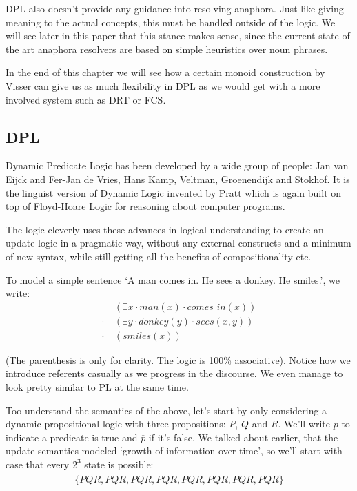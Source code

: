 \documentclass[12pt]{article}
\begin{document}
\begin{itemize}
DPL also doesn't provide any guidance into resolving anaphora. Just like giving meaning to the actual concepts, this must be handled outside of the logic. We will see later in this paper that this stance makes sense, since the current state of the art anaphora resolvers are based on simple heuristics over noun phrases.

In the end of this chapter we will see how a certain monoid construction by Visser can give us as much flexibility in DPL as we would get with a more involved system such as DRT or FCS.
\end{itemize}

\subsection{DPL}

Dynamic Predicate Logic has been developed by a wide group of people: Jan van Eijck and Fer-Jan de Vries\cite{eijck1992dynamic}, Hans Kamp, Veltman, Groenendijk and Stokhof. It is the linguist version of Dynamic Logic invented by Pratt\cite{pratt1976semantical} which is again built on top of Floyd-Hoare Logic for reasoning about computer programs.

The logic cleverly uses these advances in logical understanding to create an update logic in a pragmatic way, without any external constructs and a minimum of new syntax, while still getting all the benefits of compositionality etc.

To model a simple sentence `A man comes in. He sees a donkey. He smiles.', we write:
%
\begin{align}
&(\exists x \cdot man(x) \cdot comes\_in(x)) \nonumber\\
\cdot\ &(\exists y \cdot donkey(y) \cdot sees(x,y)) \nonumber\\
\cdot\ &(smiles(x)) \nonumber
\end{align}

(The parenthesis is only for clarity. The logic is 100\% associative). Notice how we introduce referents casually as we progress in the discourse. We even manage to look pretty similar to PL at the same time. 

Too understand the semantics of the above, let's start by only considering a dynamic propositional logic with three propositions: $P$, $Q$ and $R$. We'll write $p$ to indicate a predicate is true and $\overline{p}$ if it's false. We talked about earlier, that the update semantics modeled `growth of information over time', so we'll start with case that every $2^3$ state is possible:
%
\begin{align}
\{\overline{PQR}, \overline{PQ}R, \overline{P}Q\overline{R}, \overline{P}QR, P\overline{QR}, P\overline{Q}R, PQ\overline{R}, PQR\} \label{dpl_all_states}
\end{align}
\end{document}
